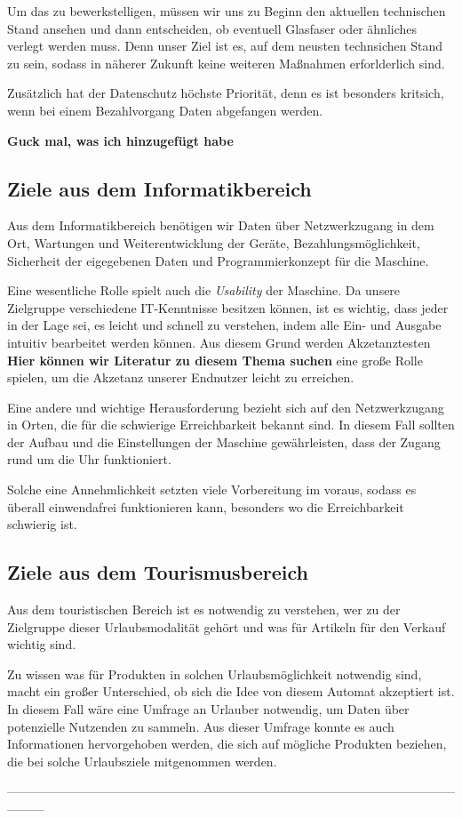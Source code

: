 Um das zu bewerkstelligen, müssen wir uns zu Beginn den aktuellen technischen Stand ansehen und dann entscheiden, 
ob eventuell Glasfaser oder ähnliches verlegt werden muss. Denn unser Ziel ist es, auf dem neusten technsichen 
Stand zu sein, sodass in näherer Zukunft keine weiteren Maßnahmen erforlderlich sind.


Zusätzlich hat der Datenschutz höchste Priorität, denn es ist besonders kritsich, wenn bei einem Bezahlvorgang 
Daten abgefangen werden. 


\textbf{Guck mal, was ich hinzugefügt habe}

\subsection{Ziele aus dem Informatikbereich}
Aus dem Informatikbereich benötigen wir Daten über Netzwerkzugang in dem Ort, Wartungen und Weiterentwicklung der 
Geräte, Bezahlungsmöglichkeit, Sicherheit der eigegebenen Daten und Programmierkonzept für die Maschine.


Eine wesentliche Rolle spielt auch die \textit{Usability} der Maschine. Da unsere Zielgruppe verschiedene IT-Kenntnisse
besitzen können, ist es wichtig, dass jeder in der Lage sei, es leicht und schnell zu verstehen, indem alle Ein- und
Ausgabe intuitiv bearbeitet werden können. Aus diesem Grund werden Akzetanztesten \textbf{Hier können wir 
Literatur zu diesem Thema suchen} eine große Rolle spielen, um die Akzetanz unserer Endnutzer leicht zu erreichen. 


Eine andere und wichtige Herausforderung bezieht sich auf den Netzwerkzugang in Orten, die für die schwierige 
Erreichbarkeit bekannt sind. In diesem Fall sollten der Aufbau und die Einstellungen der Maschine gewährleisten,
 dass der Zugang rund um die Uhr funktioniert.


Solche eine Annehmlichkeit setzten viele Vorbereitung im voraus, sodass es überall einwendafrei funktionieren kann,
besonders wo die Erreichbarkeit schwierig ist. 


\subsection{Ziele aus dem Tourismusbereich}


Aus dem touristischen Bereich ist es notwendig zu verstehen, wer zu der Zielgruppe dieser Urlaubsmodalität gehört
und was für Artikeln für den Verkauf wichtig sind.


Zu wissen was für Produkten in solchen Urlaubsmöglichkeit notwendig sind, macht ein großer Unterschied, ob sich die
Idee von diesem Automat akzeptiert ist. In diesem Fall wäre eine Umfrage an Urlauber notwendig, um Daten über 
potenzielle Nutzenden zu sammeln. Aus dieser Umfrage konnte es auch Informationen hervorgehoben werden, die sich auf
mögliche Produkten beziehen, die bei solche Urlaubsziele mitgenommen werden.

---------------------------------------------------------------------------------------------------------------------